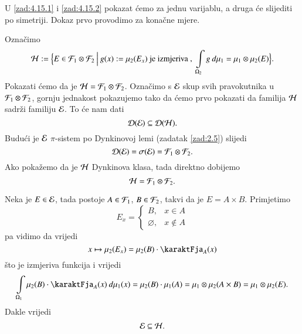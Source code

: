 \begin{rj}[\ref{zad:4.15}]
    U \ref{zad:4.15.1} i \ref{zad:4.15.2} pokazat \' cemo za jednu varijablu, a druga \' ce slijediti po simetriji.
    Dokaz prvo provodimo za kona\v cne mjere.
    
    Ozna\v cimo
    \begin{equation*}
        \mathcal{H} := \Big\{ {E \in \mathcal{F}_1 \otimes \mathcal{F}_2} \: \Big| \: {g(x) := \mu_2 (E_x) \textnormal{ je izmjeriva }, \; \int\limits_{\Omega_2} g \: d \mu_1 = \mu_1 \otimes \mu_2 (E)} \Big\}.
    \end{equation*}
    Pokazati \' cemo da je $\mathcal{H} = \mathcal{F}_1 \otimes \mathcal{F}_2$.
    Ozna\v cimo s $\mathcal{E}$ skup svih pravokutnika u $\mathcal{F}_1 \otimes \mathcal{F}_2$, gornju jednakost pokazujemo tako da \' cemo prvo pokazati da familija $\mathcal{H}$ sadr\v zi familiju $\mathcal{E}$.
    To \' ce nam dati
    \begin{equation*}
        \mathcal{D} (\mathcal{E}) \subseteq \mathcal{D} (\mathcal{H}).
    \end{equation*}
    Budu\' ci je $\mathcal{E}$ $\pi$-sistem po Dynkinovoj lemi (zadatak \ref{zad:2.5}) slijedi
    \begin{equation*}
        \mathcal{D}({\mathcal{E}}) = \sigma({\mathcal{E}}) = \mathcal{F}_1 \otimes \mathcal{F}_2.
    \end{equation*}
    Ako poka\v zemo da je $\mathcal{H}$ Dynkinova klasa, tada direktno dobijemo
    \begin{equation*}
        \mathcal{H} = \mathcal{F}_1 \otimes \mathcal{F}_2.
    \end{equation*}

    Neka je $E \in \mathcal{E}$, tada postoje $A \in \mathcal{F}_1$, $B \in \mathcal{F}_2$, takvi da je $E = A \times B$.
    Primjetimo
    \begin{equation*}
        E_x = 
        \begin{cases}
            B, &x \in A\\
            \varnothing, &x \notin A
        \end{cases}
    \end{equation*}
    pa vidimo da vrijedi
    \begin{equation*}
        x \mapsto \mu_2 (E_x) = \mu_2 (B) \cdot \karaktFja_A (x)
    \end{equation*}
    \v sto je izmjeriva funkcija i vrijedi
    \begin{equation*}
        \int\limits_{\Omega_1} \mu_2 (B) \cdot \karaktFja_A (x) \: d \mu_1 (x) = \mu_2 (B) \cdot \mu_1 (A) = \mu_1 \otimes \mu_2 (A \times B) = \mu_1 \otimes \mu_2 (E).
    \end{equation*}
    Dakle vrijedi
    \begin{equation*}
        \mathcal{E} \subseteq  \mathcal{H}.
    \end{equation*}


\end{rj}

